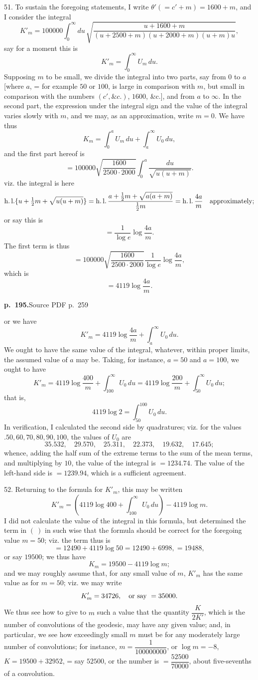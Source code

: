 \documentclass[11pt,a4paper]{article}
\newcommand{\sourcepage}[2]{\par\bigskip\noindent\textbf{p.~#1.}\hfill{\footnotesize Source PDF p.~#2}\par\nobreak\medskip}
\newcommand{\hl}{\operatorname{h.l.}}
\begin{document}
51. To sustain the foregoing statements, I write $\theta'(=c'+m)=1600+m$, and I consider the integral
\[
K'_m=100000\int_0^\infty du\,
\sqrt{\frac{u+1600+m}{(u+2500+m)(u+2000+m)(u+m)u}},
\]
say for a moment this is
\[
K'_m=\int_0^\infty U_m\,du.
\]
Supposing $m$ to be small, we divide the integral into two parts, say from $0$ to $a$ [where $a$, = for example $50$ or $100$, is large in comparison with $m$, but small in comparison with the numbers $(c', \&c.)$, $1600$, \&c.], and from $a$ to $\infty$. In the second part, the expression under the integral sign and the value of the integral varies slowly with $m$, and we may, as an approximation, write $m=0$. We have thus
\[
K_m=\int_0^a U_m\,du+\int_a^\infty U_0\,du,
\]
and the first part hereof is
\[
=100000\sqrt{\frac{1600}{2500\cdot2000}}\int_0^a\frac{du}{\sqrt{u(u+m)}}.
\]
viz. the integral is here
\[
\hl\{u+\tfrac12m+\sqrt{u(u+m)}\}
=\hl\frac{a+\tfrac12m+\sqrt{a(a+m)}}{\tfrac12m}
=\hl\frac{4a}{m}\quad\hbox{approximately};
\]
or say this is
\[
=\frac{1}{\log e}\log\frac{4a}{m}.
\]
The first term is thus
\[
=100000\sqrt{\frac{1600}{2500\cdot2000}}\frac{1}{\log e}\log\frac{4a}{m},
\]
which is
\[
=4119\log\frac{4a}{m}.
\]

\sourcepage{195}{259}
or we have
\[
K'_m=4119\log\frac{4a}{m}+\int_a^\infty U_0\,du.
\]
We ought to have the same value of the integral, whatever, within proper limits, the assumed value of $a$ may be. Taking, for instance, $a=50$ and $a=100$, we ought to have
\[
K'_m=4119\log\frac{400}{m}+\int_{100}^{\infty}U_0\,du
=4119\log\frac{200}{m}+\int_{50}^{\infty}U_0\,du;
\]
that is,
\[
4119\log2=\int_{50}^{100}U_0\,du.
\]
In verification, I calculated the second side by quadratures; viz. for the values $.50,60,70,80,90,100$, the values of $U_0$ are
\[
35.532,\quad 29.570,\quad 25.311,\quad 22.373,\quad 19.632,\quad 17.645;
\]
whence, adding the half sum of the extreme terms to the sum of the mean terms, and multiplying by $10$, the value of the integral is $=1234.74$. The value of the left-hand side is $=1239.94$, which is a sufficient agreement.

52. Returning to the formula for $K'_m$, this may be written
\[
K'_m=\left(4119\log 400+\int_{100}^{\infty}U_0\,du\right)-4119\log m.
\]
I did not calculate the value of the integral in this formula, but determined the term in $(\ )$ in such wise that the formula should be correct for the foregoing value $m=50$; viz. the term thus is
\[
=12490+4119\log50=12490+6998,=19488,
\]
or say $19500$; we thus have
\[
K_m=19500-4119\log m;
\]
and we may roughly assume that, for any small value of $m$, $K'_m$ has the same value as for $m=50$; viz. we may write
\[
K'_m=34726,\quad \hbox{or say }=35000.
\]
We thus see how to give to $m$ such a value that the quantity $\dfrac{K}{2K'}$, which is the number of convolutions of the geodesic, may have any given value; and, in particular, we see how exceedingly small $m$ must be for any moderately large number of convolutions; for instance, $m=\dfrac{1}{100000000}$, or $\log m=-8$, $K=19500+32952$, = say $52500$, or the number is $=\dfrac{52500}{70000}$, about five-sevenths of a convolution.
\end{document}

